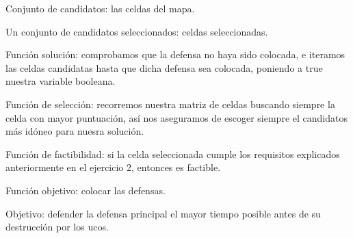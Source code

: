 Conjunto de candidatos: las celdas del mapa.

Un conjunto de candidatos seleccionados: celdas seleccionadas.

Función solución: comprobamos que la defensa no haya sido colocada, e iteramos las celdas candidatas hasta que dicha defensa sea colocada, poniendo a true nuestra variable booleana.

Función de selección: recorremos nuestra matriz de celdas buscando siempre la celda con mayor puntuación, así nos aseguramos de escoger siempre el candidatos más idóneo para nuesra solución.

Función de factibilidad: si la celda seleccionada cumple los requisitos explicados anteriormente en el ejercicio 2, entonces es factible.

Función objetivo: colocar las defensas.

Objetivo: defender la defensa principal el mayor tiempo posible antes de su destrucción por los ucos.